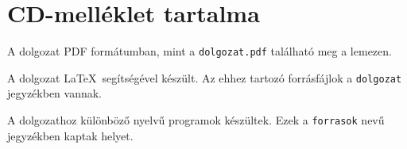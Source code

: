 \newpage
\section*{CD-melléklet tartalma}

\vskip 8mm

A dolgozat PDF formátumban, mint a \texttt{dolgozat.pdf} található meg a lemezen.

\bigskip

\noindent A dolgozat \LaTeX\ segítségével készült. Az ehhez tartozó forrásfájlok a \texttt{dolgozat} jegyzékben vannak.

\bigskip

\noindent  A dolgozathoz különböző nyelvű programok készültek. Ezek a \texttt{forrasok} nevű jegyzékben kaptak helyet.

